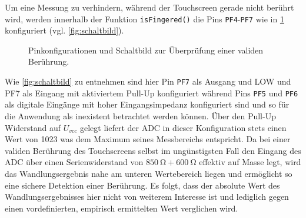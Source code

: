 		Um eine Messung zu verhindern, während der Touchscreen gerade nicht berührt wird, werden innerhalb der Funktion \texttt{isFingered()} die Pins \texttt{PF4}-\texttt{PF7} wie in \cref{fig:fingered} konfiguriert (vgl. \cref{fig:schaltbild}).
		\begin{figure}[h]
			\centering
			
			\caption{Pinkonfigurationen und Schaltbild zur Überprüfung einer validen Berührung.}
			\label{fig:fingered}
		\end{figure}
		Wie \cref{fig:schaltbild} zu entnehmen sind hier Pin \texttt{PF7} als Ausgang und LOW und PF7 als Eingang mit aktiviertem Pull-Up konfiguriert während Pins \texttt{PF5} und \texttt{PF6} als digitale Eingänge mit hoher Eingangsimpedanz konfiguriert sind und so für die Anwendung als inexistent betrachtet werden können.
		Über den Pull-Up Widerstand auf \(U_{vcc}\) gelegt liefert der ADC in dieser Konfiguration stets einen Wert von 1023 was dem Maximum seines Messbereichs entspricht.
		Da bei einer validen Berührung des Touchscreens selbst im ungünstigsten Fall den Eingang des ADC über einen Serienwiderstand von \(\SI{850}{\ohm} + \SI{600}{\ohm}\) effektiv auf Masse legt, wird das Wandlungsergebnis nahe am unteren Wertebereich liegen und ermöglicht so eine sichere Detektion einer Berührung.
		Es folgt, dass der absolute Wert des Wandlungsergebnisses hier nicht von weiterem Interesse ist und lediglich gegen einen vordefinierten, empirisch ermittelten Wert verglichen wird.\par\medskip

